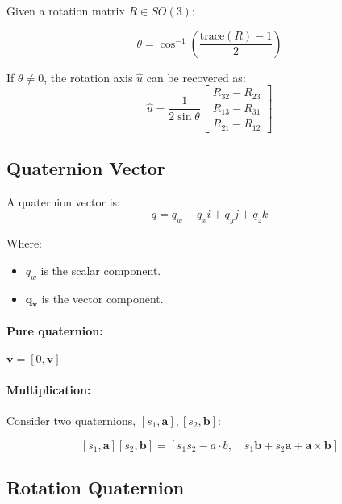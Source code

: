 \documentclass[11pt,a4paper]{article}
\begin{document}
Given a rotation matrix \( R \in SO(3) \):

\[
\theta = \cos^{-1}\!\left( \frac{\mathrm{trace}(R) - 1}{2} \right)
\]

If \( \theta \neq 0 \), the rotation axis \( \hat{u} \) can be recovered as:
\[
\hat{u} =
\frac{1}{2 \sin\theta}
\begin{bmatrix}
R_{32} - R_{23} \\
R_{13} - R_{31} \\
R_{21} - R_{12}
\end{bmatrix}
\]

\subsection*{Quaternion Vector}

A quaternion vector is:
\[
q = q_w + q_x i + q_y j + q_z k
\]

Where:
\begin{itemize}
    \item \( q_w \) is the scalar component.
    \item \( \mathbf{q_v}\) is the vector component.
\end{itemize}

\paragraph{Pure quaternion: } \( \mathbf{v} = [0, \mathbf{v}] \)

\paragraph{Multiplication: } Consider two quaternions, \( [s_1, \mathbf{a}], [s_2, \mathbf{b}] \):

\[
[s_1, \mathbf{a}][s_2, \mathbf{b}] = [s_1 s_2 - a \cdot b, \quad s_1 \mathbf{b} + s_2 \mathbf{a} + \mathbf{a} \times \mathbf{b}]
\]

\subsection*{Rotation Quaternion}
\end{document}

